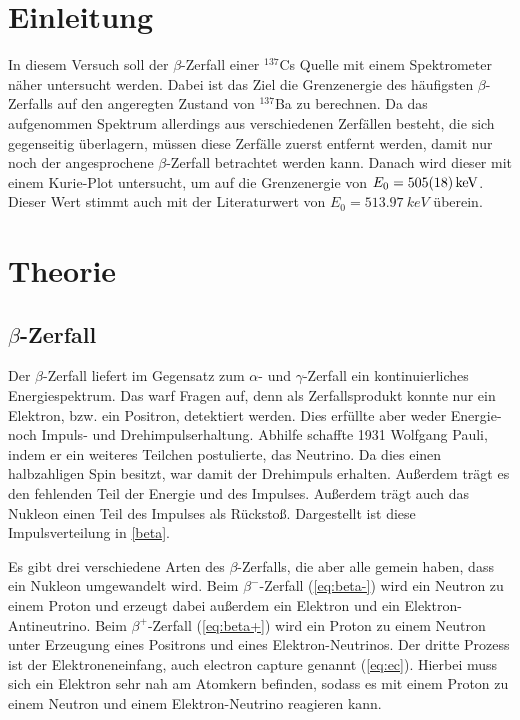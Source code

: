 \setlength{\multlinegap}{0pt}
\section{Einleitung}
In diesem Versuch soll der $\beta$-Zerfall einer $^{137}$Cs Quelle mit einem Spektrometer näher untersucht werden. Dabei ist das Ziel die Grenzenergie des häufigsten $\beta$-Zerfalls auf den angeregten Zustand von $^{137}$Ba zu berechnen. Da das aufgenommen Spektrum allerdings aus verschiedenen Zerfällen besteht, die sich gegenseitig überlagern, müssen diese Zerfälle zuerst entfernt werden, damit nur noch der angesprochene $\beta$-Zerfall betrachtet werden kann. Danach wird dieser mit einem Kurie-Plot untersucht, um auf die Grenzenergie von $E_{0} = \SI{505 \pm 18}{keV}$. Dieser Wert stimmt auch mit der Literaturwert von $E_{0} =\SI{513,97}{keV}$ \autocite{Zerfallsreihe} überein.
\section{Theorie}
\subsection{$\beta$-Zerfall}
Der $\beta$-Zerfall liefert im Gegensatz zum $\alpha$- und $\gamma$-Zerfall ein kontinuierliches Energiespektrum. Das warf Fragen auf, denn als Zerfallsprodukt konnte nur ein Elektron, bzw. ein Positron, detektiert werden. Dies erfüllte aber weder Energie- noch Impuls- und Drehimpulserhaltung. Abhilfe schaffte 1931 Wolfgang Pauli, indem er ein weiteres Teilchen postulierte, das Neutrino. Da dies einen halbzahligen Spin besitzt, war damit der Drehimpuls erhalten. Außerdem trägt es den fehlenden Teil der Energie und des Impulses. Außerdem trägt auch das Nukleon einen Teil des Impulses als Rückstoß. Dargestellt ist diese Impulsverteilung in \cref{beta}.


Es gibt drei verschiedene Arten des $\beta$-Zerfalls, die aber alle gemein haben, dass ein Nukleon umgewandelt wird. Beim $\beta^-$-Zerfall (\cref{eq:beta-}) wird ein Neutron zu einem Proton und erzeugt dabei außerdem ein Elektron und ein Elektron-Antineutrino. Beim $\beta^+$-Zerfall (\cref{eq:beta+}) wird ein Proton zu einem Neutron unter Erzeugung eines Positrons und eines Elektron-Neutrinos. Der dritte Prozess ist der Elektroneneinfang, auch electron capture genannt (\cref{eq:ec}). Hierbei muss sich ein Elektron sehr nah am Atomkern befinden, sodass es mit einem Proton zu einem Neutron und einem Elektron-Neutrino reagieren kann.

